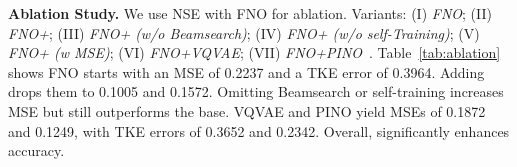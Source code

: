 \textbf{Ablation Study.} 
We use NSE with FNO for ablation. Variants: 
(I) \textit{FNO}; 
(II) \textit{FNO+\method{}}; 
(III) \textit{FNO+\method{} (w/o Beamsearch)}; 
(IV) \textit{FNO+\method{} (w/o self-Training)}; 
(V) \textit{FNO+\method{} (w MSE)}; 
(VI) \textit{FNO+VQVAE}; 
(VII) \textit{FNO+PINO}~\cite{10.1145/3648506}. 
Table~\ref{tab:ablation} shows FNO starts with an MSE of 0.2237 and a TKE error of 0.3964. Adding \method{} drops them to 0.1005 and 0.1572. Omitting Beamsearch or self-training increases MSE but still outperforms the base. VQVAE and PINO yield MSEs of 0.1872 and 0.1249, with TKE errors of 0.3652 and 0.2342. Overall, \method{} significantly enhances accuracy.





